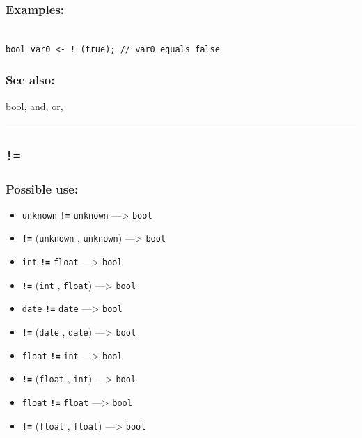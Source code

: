 \documentclass[]{book}
\providecommand{\tightlist}{%
  \setlength{\itemsep}{0pt}\setlength{\parskip}{0pt}}
\theoremstyle{definition}
\theoremstyle{definition}
\theoremstyle{definition}
\theoremstyle{remark}
\begin{document}
\subsubsection{Examples:}\label{examples-1}

\begin{verbatim}
 
bool var0 <- ! (true); // var0 equals false
\end{verbatim}

\subsubsection{See also:}\label{see-also-2}

\href{operators-b-to-c.html\#bool}{bool},
\href{operators-a-to-a.html\#and}{and},
\href{operators-n-to-r.html\#or}{or},

\begin{center}\rule{0.5\linewidth}{\linethickness}\end{center}

\subsection{\texorpdfstring{\texttt{!=}}{!=}}\label{section-4}

\subsubsection{Possible use:}\label{possible-use-4}

\begin{itemize}
\tightlist
\item
  \texttt{unknown} \textbf{\texttt{!=}} \texttt{unknown}
  ---\textgreater{} \texttt{bool}
\item
  \textbf{\texttt{!=}} (\texttt{unknown} , \texttt{unknown})
  ---\textgreater{} \texttt{bool}
\item
  \texttt{int} \textbf{\texttt{!=}} \texttt{float} ---\textgreater{}
  \texttt{bool}
\item
  \textbf{\texttt{!=}} (\texttt{int} , \texttt{float}) ---\textgreater{}
  \texttt{bool}
\item
  \texttt{date} \textbf{\texttt{!=}} \texttt{date} ---\textgreater{}
  \texttt{bool}
\item
  \textbf{\texttt{!=}} (\texttt{date} , \texttt{date}) ---\textgreater{}
  \texttt{bool}
\item
  \texttt{float} \textbf{\texttt{!=}} \texttt{int} ---\textgreater{}
  \texttt{bool}
\item
  \textbf{\texttt{!=}} (\texttt{float} , \texttt{int}) ---\textgreater{}
  \texttt{bool}
\item
  \texttt{float} \textbf{\texttt{!=}} \texttt{float} ---\textgreater{}
  \texttt{bool}
\item
  \textbf{\texttt{!=}} (\texttt{float} , \texttt{float})
  ---\textgreater{} \texttt{bool}
\end{itemize}
\end{document}
